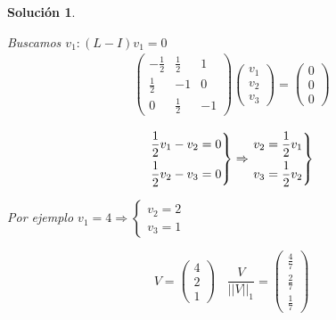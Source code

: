 \documentclass[11pt, a4paper]{article}
\newif\IfInSansMode
\numberwithin{equation}{section}
\theoremstyle{theorem-style}
\theoremstyle{definition-style}
\theoremstyle{remark-style}
\newtheorem*{sol}{Solución}
\theoremstyle{example-style}
\newenvironment{rcases}
{\left.\begin{aligned}}
    {\end{aligned}\right\rbrace}
\begin{document}
\begin{sol}
\begin{enumerate}[label=\alph*)]
            Buscamos $v_1 : (L - I)v_1 = 0$
            \begin{align*}
                \label{eq:}
                \begin{pmatrix}
                    -\frac{1}{2} & \frac{1}{2} & 1 \\
                    \frac{1}{2} & -1 & 0 \\
                    0 & \frac{1}{2} & -1
                \end{pmatrix} \begin{pmatrix}
                    v_1 \\
                    v_2 \\
                    v_3
                \end{pmatrix} = \begin{pmatrix}
                    0 \\
                    0 \\
                    0
                \end{pmatrix}
            \end{align*}

            $$ \begin{rcases}
                \frac{1}{2}v_1 - v_2 = 0 \\
                \frac{1}{2}v_2 - v_3 = 0
            \end{rcases} \Rightarrow \begin{rcases}
                v_2 = \frac{1}{2}v_1 \\
                v_3 = \frac{1}{2}v_2
            \end{rcases}$$

            Por ejemplo $v_1 = 4 \Rightarrow \begin{cases}
                v_2 = 2 \\
                v_3 = 1
            \end{cases}$

            $$V = \begin{pmatrix}
                4 \\
                2 \\
                1
            \end{pmatrix} \ \ \ \ \frac{V}{||V||_1} = \begin{pmatrix}
                \frac{4}{7} \\
                \frac{2}{7} \\
                \frac{1}{7} 
            \end{pmatrix}$$
     \end{enumerate}
\end{sol}
\end{document}
